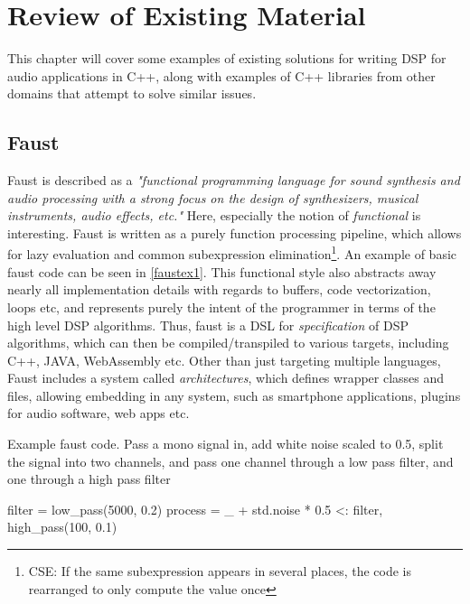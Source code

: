 \chapter{Review of Existing Material} \label{sec:review}


This chapter will cover some examples of existing solutions for writing DSP for audio applications in C++,
along with examples of C++ libraries from other domains that attempt to solve similar issues.

\section{Faust}
Faust is described as a \emph{"functional programming language for sound synthesis and audio processing with a strong focus on the design
  of synthesizers, musical instruments, audio effects, etc."\autocite{faustwebsite}} Here, especially the notion of \emph{functional} is
interesting. Faust is written as a purely function processing pipeline, which allows for lazy evaluation and
common subexpression elimination\footnote{CSE: If the same subexpression appears in several places, the code is rearranged to only compute the value once}. An example of basic faust code can be seen in
\autoref{faustex1}. This functional style also abstracts away nearly all implementation details with
regards to buffers, code vectorization, loops etc, and represents purely the intent of the programmer in
terms of the high level DSP algorithms. Thus, faust is a DSL for \emph{specification} of DSP algorithms,
which can then be compiled/transpiled to various targets, including C++, JAVA, WebAssembly etc. Other than
just targeting multiple languages, Faust includes a system called \emph{architectures}, which defines
wrapper classes and files, allowing embedding in any system, such as smartphone applications, plugins for
audio software, web apps etc.

\begin{listing}
  \label{faustex1}
  \caption{ Example faust code. Pass a mono signal in, add white noise scaled to 0.5, split the signal into two channels, and pass one channel through a low pass filter, and one through a high pass filter }
  \begin{cppcodenl}
  filter = low_pass(5000, 0.2)
  process = _ + std.noise * 0.5 <: filter, high_pass(100, 0.1)
  \end{cppcodenl}
\end{listing}

